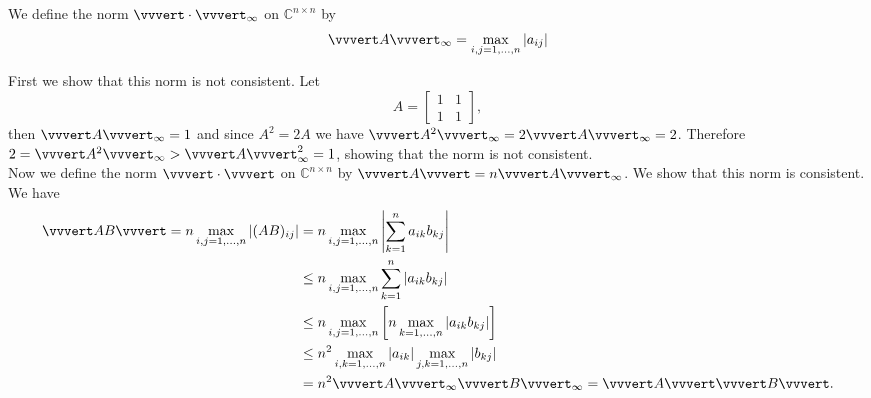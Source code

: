 \documentclass[10pt]{report}
\begin{document}
We define the norm $\vvvert \cdot \vvvert_{\infty}$ on $\mathbb{C}^{n \times n}$ by
\[ \vvvert A \vvvert_{\infty} = \max_{i,j=1, \ldots, n} |a_{ij}|\]

First we show that this norm is not consistent. Let 
\[ A = \left[ \begin{array}{cc} 1 & 1\\ 1 & 1 \end{array} \right],\]
then $\vvvert A \vvvert_{\infty}= 1$ and since $A^2=2A$ we have $\vvvert A^2\vvvert_{\infty}= 2 \vvvert A \vvvert_{\infty}=2$. Therefore $2=\vvvert A^2 \vvvert_{\infty}>  \vvvert A \vvvert_{\infty}^2=1 $, showing that the norm is not consistent.\\

Now we define the norm $\vvvert \cdot \vvvert$ on $\mathbb{C}^{n \times n}$ by $ \vvvert A \vvvert = n  \vvvert A \vvvert_{\infty}$. We show that this norm is consistent. We have 
\begin{align*}
\vvvert AB \vvvert = n \max_{i,j=1, \ldots, n}|(AB)_{ij}|&= n \max_{i,j=1, \ldots, n} \left|\sum_{k=1}^n a_{ik}b_{kj} \right|\\
&\leq n \max_{i,j=1, \ldots, n}\sum_{k=1}^n |a_{ik}b_{kj}| \\
&\leq n  \max_{i,j=1, \ldots, n} \left[ n \max_{k=1, \ldots, n}  |a_{ik}b_{kj}| \right] \\
& \leq n^2 \max_{i,k=1, \ldots, n} |a_{ik}|\max_{j,k=1, \ldots, n} |b_{kj}| \\
&=n ^2\vvvert A \vvvert_\infty \vvvert B\vvvert_\infty=  \vvvert A \vvvert \vvvert B\vvvert.
\end{align*} 
\end{document}
